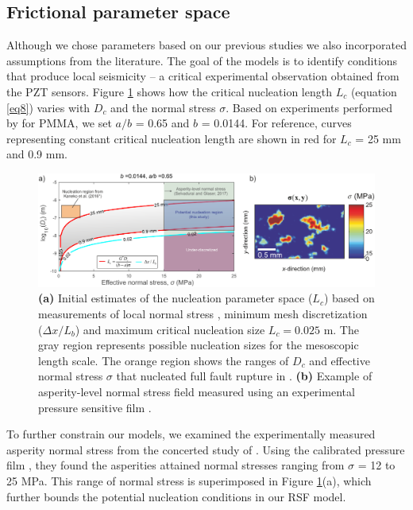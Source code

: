\documentclass[preprint,1p, 10pt,authoryear]{elsarticle}
\begin{document}
\subsection{Frictional parameter space}
\label{ParameterSpace}
Although we chose parameters based on our previous studies we also incorporated assumptions from the literature. The goal of the models is to identify conditions that produce local seismicity -- a critical experimental observation obtained from the PZT sensors. Figure \ref{fig4} shows how the critical nucleation length $L_{c}$ (equation \eqref{eq8}) varies with $D_{c}$ and the normal stress $\sigma$.  Based on experiments performed by \citet{Berthoude1999} for PMMA, we set $a/b$ = 0.65 and $b$ = 0.0144. For reference, curves representing constant critical nucleation length are shown in red for $L_{c}$ = 25 mm and 0.9 mm.   

\begin{figure}
	\centering
	\includegraphics[scale = 0.95]{FIG4.pdf} 
	\caption{\textbf{(a) }Initial estimates of the nucleation parameter space ($L_{c}$) based on measurements of local normal stress \citep{Selvadurai2017}, minimum mesh discretization ($\Delta x /L_{b}$) and maximum critical nucleation size $L_{c} = 0.025$ m. The gray region represents possible nucleation sizes for the mesoscopic length scale.  The orange region shows the ranges of $D_{c}$ and effective normal stress $\sigma$ that nucleated full fault rupture in \citet[][, *$a/b$ = 0.6944]{Kaneko2016}. \textbf{(b) }Example of asperity-level normal stress field measured using an experimental pressure sensitive film \citep[adapted from ][]{Selvadurai2017} \citet{Selvadurai2017}.}
	\label{fig4}
\end{figure}

To further constrain our models, we examined the experimentally measured asperity normal stress from the concerted study of \citet{Selvadurai2017}. Using the calibrated pressure film \citep{Selvadurai2015}, they found the asperities attained normal stresses ranging from $\sigma$ = 12 to 25 MPa. This range of normal stress is superimposed in Figure \ref{fig4}(a), which further bounds the potential nucleation conditions in our RSF model.
\end{document}
